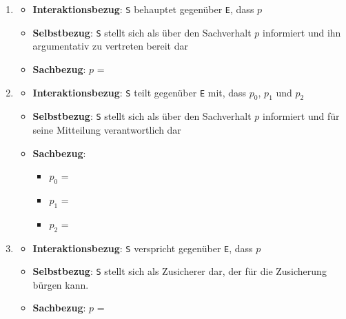 \begin{enumerate}[label=\roman*.]
    \item {}
    \begin{itemize}
        \item \textbf{Interaktionsbezug}: \texttt{S} behauptet gegenüber \texttt{E}, dass \texttt{$p$}
        \item \textbf{Selbstbezug}: \texttt{S} stellt sich als über den Sachverhalt \texttt{$p$} informiert und ihn argumentativ zu vertreten bereit dar
        \item \textbf{Sachbezug}: \texttt{$p$} = 
    \end{itemize}
    \item {}
    \begin{itemize}
        \item \textbf{Interaktionsbezug}: \texttt{S} teilt gegenüber \texttt{E} mit, dass \texttt{$p_0$}, \texttt{$p_1$} und \texttt{$p_2$}
        \item \textbf{Selbstbezug}: \texttt{S} stellt sich als über den Sachverhalt \texttt{$p$} informiert und für seine Mitteilung verantwortlich dar
        \item \textbf{Sachbezug}: 
        \begin{itemize}
            \item \texttt{$p_0$} = 
            \item \texttt{$p_1$} = 
            \item \texttt{$p_2$} = 
        \end{itemize}
    \end{itemize}
    \item {}
    \begin{itemize}
        \item \textbf{Interaktionsbezug}: \texttt{S} verspricht gegenüber \texttt{E}, dass \texttt{$p$}
        \item \textbf{Selbstbezug}: \texttt{S} stellt sich als Zusicherer dar, der für die Zusicherung bürgen kann.
        \item \textbf{Sachbezug}: \texttt{$p$} = 
    \end{itemize}
\end{enumerate}


